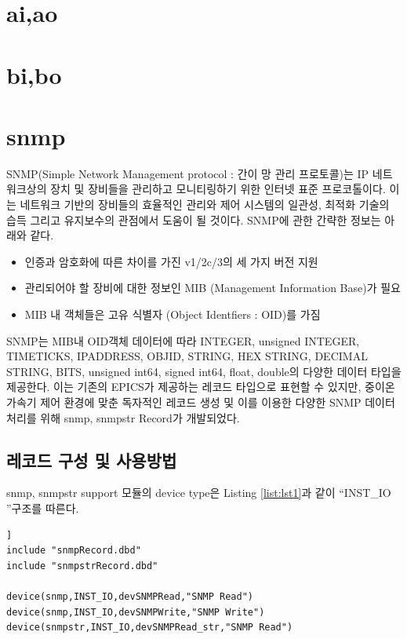 \documentclass[11pt
  , a4paper
  , article
  , oneside
]{memoir}
\begin{document}
\clearpage


\chapter{ai,ao}

\chapter{bi,bo}

\chapter{snmp}
SNMP(Simple Network Management protocol : 간이 망 관리 프로토콜)는 IP 네트워크상의 장치 및 장비들을 관리하고 모니티링하기 위한 인터넷 표준 프로코톨이다. 이는 네트워크 기반의 장비들의 효율적인 관리와 제어 시스템의 일관성, 최적화 기술의 습득 그리고 유지보수의 관점에서 도움이 될 것이다.
SNMP에 관한 간략한 정보는 아래와 같다.

\begin{itemize}
\item 인증과 암호화에 따른 차이를 가진 v1/2c/3의 세 가지 버전 지원
\item 관리되어야 할 장비에 대한 정보인 MIB (Management Information Base)가 필요
\item MIB 내 객체들은 고유 식별자 (Object Identfiers : OID)를 가짐 
\end{itemize}

SNMP는 MIB내 OID객체 데이터에 따라 INTEGER, unsigned INTEGER, TIMETICKS, IPADDRESS, OBJID, STRING, HEX STRING, DECIMAL STRING, BITS, unsigned int64, signed int64, float, double의 다양한 데이터 타입을 제공한다. 이는 기존의 EPICS가 제공하는 레코드 타입으로 표현할 수 있지만, 중이온가속기 제어 환경에 맞춘 독자적인 레코드 생성 및 이를 이용한 다양한 SNMP 데이터 처리를 위해 snmp, snmpstr Record가 개발되었다.

\section{레코드 구성 및 사용방법}
snmp, snmpstr support 모듈의 device type은 Listing \ref{list:lst1}과 같이 \textquotedblleft INST\_IO \textquotedblright 구조를 따른다.
\begin{lstlisting}[style=termstyle, escapechar=^, caption=snmpDevSoft.dbd파일, label={list:lst1}]]
include "snmpRecord.dbd"
include "snmpstrRecord.dbd"

device(snmp,INST_IO,devSNMPRead,"SNMP Read")
device(snmp,INST_IO,devSNMPWrite,"SNMP Write")
device(snmpstr,INST_IO,devSNMPRead_str,"SNMP Read")
\end{lstlisting}
\end{document}

